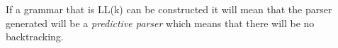 \documentclass[12pt, letterpaper]{article}
\theoremstyle{definition}
\begin{document}
If a grammar that is LL(k) can be constructed it will mean that the parser generated will be a \textit{predictive parser} which means that there will be no backtracking.


\end{document}
